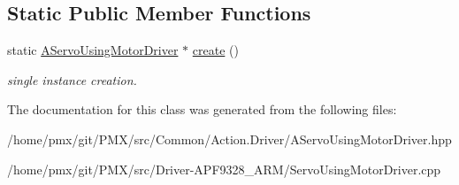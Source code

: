 \subsection*{Static Public Member Functions}
\begin{DoxyCompactItemize}
\item 
\mbox{\label{classAServoUsingMotorDriver_a2b9b877179c22982251a5e645f60f736}} 
static \hyperlink{classAServoUsingMotorDriver}{A\+Servo\+Using\+Motor\+Driver} $\ast$ \hyperlink{classAServoUsingMotorDriver_a2b9b877179c22982251a5e645f60f736}{create} ()
\begin{DoxyCompactList}\small\item\em single instance creation. \end{DoxyCompactList}\end{DoxyCompactItemize}


The documentation for this class was generated from the following files\+:\begin{DoxyCompactItemize}
\item 
/home/pmx/git/\+P\+M\+X/src/\+Common/\+Action.\+Driver/A\+Servo\+Using\+Motor\+Driver.\+hpp\item 
/home/pmx/git/\+P\+M\+X/src/\+Driver-\/\+A\+P\+F9328\+\_\+\+A\+R\+M/Servo\+Using\+Motor\+Driver.\+cpp\end{DoxyCompactItemize}
